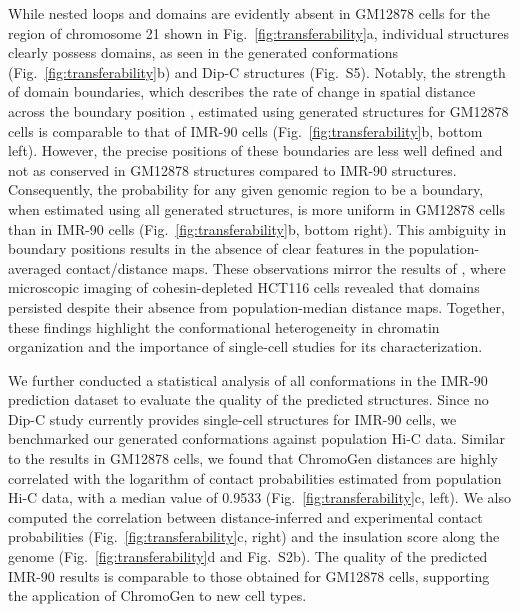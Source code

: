 \documentclass[12pt,letterpaper]{article}
\begin{document}
While nested loops and domains are evidently absent in GM12878 cells for the region of chromosome 21 shown in Fig.~\ref{fig:transferability}a, individual structures clearly possess domains, as seen in the generated conformations (Fig.~\ref{fig:transferability}b) and Dip-C structures (Fig.~S5). Notably, the strength of domain boundaries,  which describes the rate of change in spatial distance across the boundary position \cite{Bintu2018}, estimated using generated structures for GM12878 cells is comparable to that of IMR-90 cells (Fig.~\ref{fig:transferability}b, bottom left). However, the precise positions of these boundaries are less well defined and not as conserved in GM12878 structures compared to IMR-90 structures. Consequently, the probability for any given genomic region to be a boundary, when estimated using all generated structures, is more uniform in GM12878 cells than in IMR-90 cells (Fig.~\ref{fig:transferability}b, bottom right). This ambiguity in boundary positions results in the absence of clear features in the population-averaged contact/distance maps. These observations mirror the results of \textcite{Bintu2018}, where microscopic imaging of cohesin-depleted HCT116 cells revealed that domains persisted despite their absence from population-median distance maps. Together, these findings highlight the conformational heterogeneity in chromatin organization and the importance of single-cell studies for its characterization.


We further conducted a statistical analysis of all conformations in the IMR-90 prediction dataset to evaluate the quality of the predicted structures. Since no Dip-C study currently provides single-cell structures for IMR-90 cells, we benchmarked our generated conformations against population Hi-C data. Similar to the results in GM12878 cells, we found that ChromoGen distances are highly correlated with the logarithm of contact probabilities estimated from population Hi-C data, with a median value of 0.9533 (Fig.~\ref{fig:transferability}c, left). We also computed the correlation between distance-inferred and experimental contact probabilities (Fig.~\ref{fig:transferability}c, right) and the insulation score along the genome (Fig.~\ref{fig:transferability}d and Fig.~S2b). The quality of the predicted IMR-90 results is comparable to those obtained for GM12878 cells, supporting the application of ChromoGen to new cell types.
\end{document}
